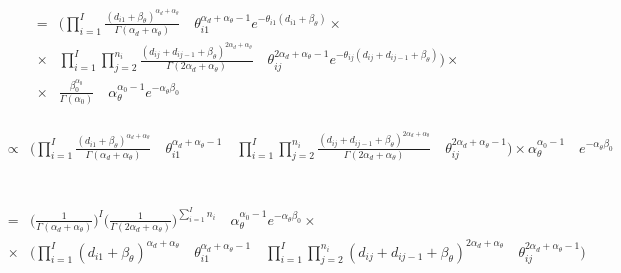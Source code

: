 \documentclass[10pt]{report}
\theoremstyle{plain}
\begin{document}
\begin{eqnarray*}
&=&\Bigg(\prod_{i=1}^I \frac{(d_{i1}+\beta_\theta)^{\alpha_d+\alpha_\theta}}{\Gamma(\alpha_d+\alpha_\theta)} \quad \theta_{i1}^{\alpha_d+\alpha_\theta-1} e^{-\theta_{i1}(d_{i1}+\beta_\theta)} \times\\
&\times& \prod_{i=1}^I \prod_{j=2}^{n_i} \frac{(d_{ij}+d_{ij-1}+\beta_\theta)^{2\alpha_d+\alpha_\theta}}{\Gamma(2\alpha_d+\alpha_\theta)} \quad \theta_{ij}^{2\alpha_d+\alpha_\theta-1} e^{-\theta_{ij}(d_{ij}+d_{ij-1}+\beta_\theta)}\Bigg) \times \\
&\times & \frac{\beta_0^{\alpha_0}}{\Gamma(\alpha_0)} \quad \alpha_\theta^{\alpha_0-1} e^{-\alpha_\theta\beta_0}
\end{eqnarray*}
\\
\begin{eqnarray*}
&\propto& \Bigg(\prod_{i=1}^I \frac{(d_{i1}+\beta_\theta)^{\alpha_d+\alpha_\theta}}{\Gamma(\alpha_d+\alpha_\theta)} \quad \theta_{i1}^{\alpha_d+\alpha_\theta-1} \quad \prod_{i=1}^I \prod_{j=2}^{n_i} \frac{(d_{ij}+d_{ij-1}+\beta_\theta)^{2\alpha_d+\alpha_\theta}}{\Gamma(2\alpha_d+\alpha_\theta)}\quad\theta_{ij}^{2\alpha_d+\alpha_\theta-1}\Bigg) \times \alpha_\theta^{\alpha_0-1} \quad e^{-\alpha_\theta\beta_0}
\end{eqnarray*}
\\
\\
\begin{eqnarray*}
&=&\Big(\frac{1}{\Gamma(\alpha_d+\alpha_\theta)}\Big)^I \Big(\frac{1}{\Gamma(2\alpha_d+\alpha_\theta)}\Big)^{\sum_{i=1}^I n_i} \quad \alpha_\theta^{\alpha_0-1} e^{-\alpha_\theta\beta_0} \times \\
&\times& \Bigg(\prod_{i=1}^I (d_{i1}+\beta_\theta)^{\alpha_d+\alpha_\theta} \quad \theta_{i1}^{\alpha_d+\alpha_\theta-1}\quad \prod_{i=1}^I \prod_{j=2}^{n_i} (d_{ij}+d_{ij-1}+\beta_\theta)^{2\alpha_d+\alpha_\theta} \quad \theta_{ij}^{2\alpha_d+\alpha_\theta-1}\Bigg)
\end{eqnarray*}
\\
\\
\\
\end{document}
